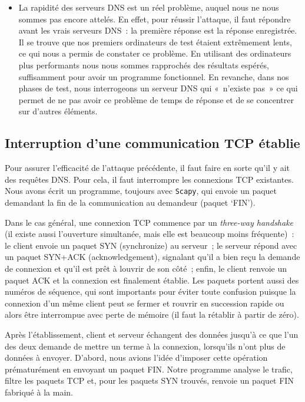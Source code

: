 \documentclass[a4paper, 12pt,twoside]{article}
\begin{document}
\begin{itemize}[label=\color{bleu303}\textbullet{}]
        \item La rapidité des serveurs DNS est un réel problème, auquel nous ne nous sommes pas encore attelés. En effet, pour réussir l'attaque, il faut répondre avant les vrais serveurs DNS~: la première réponse est la réponse enregistrée. Il se trouve que nos premiers ordinateurs de test étaient extrêmement lents, ce qui nous a permis de constater ce problème. En utilisant des ordinateurs plus performants nous nous sommes rapprochés des résultats espérés, suffisamment pour avoir un programme fonctionnel. En revanche, dans nos phases de test, nous interrogeons un serveur DNS qui «~n'existe pas~» ce qui permet de ne pas avoir ce problème de temps de réponse et de se concentrer sur d'autres éléments.
    \end{itemize}

    \subsection{Interruption d'une communication TCP établie}%


  Pour assurer l'efficacité de l'attaque précédente, il faut faire en sorte qu'il y ait des requêtes DNS. Pour cela, il faut interrompre les connexions TCP existantes. Nous avons écrit un programme, toujours avec \verb!Scapy!, qui envoie un paquet demandant la fin de la communication au demandeur (paquet ‘FIN').


       Dans le cas général, une connexion TCP commence par un \emph{three-way handshake} (il existe aussi l'ouverture simultanée, mais elle est beaucoup moins fréquente)~: le client envoie un paquet SYN (synchronize) au serveur~; le serveur répond avec un paquet SYN+ACK (acknowledgement), signalant qu'il a bien reçu la demande de connexion et qu'il est prêt à louvrir de son côté~; enfin, le client renvoie un paquet ACK et la connexion est finalement établie. Les paquets portent aussi des numéros de séquence, qui sont importants pour éviter toute confusion puisque la connexion d'un même client peut se fermer et rouvrir en succession rapide ou alors être interrompue avec perte de mémoire (il faut la rétablir à partir de zéro).

      Après l'établissement, client et serveur échangent des données jusqu'à ce que l'un des deux demande de mettre un terme à la connexion, lorsqu'ils n'ont plus de données à envoyer. D'abord, nous avions l'idée d'imposer cette opération prématurément en envoyant un paquet FIN. Notre programme analyse le trafic, filtre les paquets TCP et, pour les paquets SYN trouvés, renvoie un paquet FIN fabriqué à la main.
\end{document}
